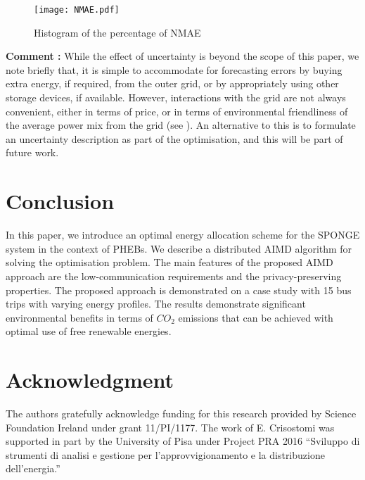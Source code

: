 \documentclass[journal]{IEEEtran}
\begin{document}
\begin{figure}[htbp]
	\begin{center}
		{\texttt{[image: NMAE.pdf]}}
		\caption{Histogram of the percentage of NMAE}
		\label{UCDNMAE}
	\end{center}
\end{figure}


{\bf Comment :}  While the effect of uncertainty is beyond the scope of this paper, we note briefly that, it is simple to accommodate for forecasting errors by buying extra energy, if required, from the outer grid, or by appropriately using other storage devices, if available. However, interactions with the grid are not always convenient, either in terms of price, or in terms of environmental friendliness of the average power mix from the grid (see \cite{TITS_V2G}). An alternative to this is to formulate an uncertainty
description as part of the optimisation, and this will be part of future work.   


\section{Conclusion}  \label{Conclusion}



In this paper, we introduce an optimal energy allocation scheme for the SPONGE system in the context of PHEBs. We describe a distributed AIMD algorithm for solving the optimisation problem. The main features of the proposed AIMD approach are the low-communication requirements and the privacy-preserving properties. The proposed approach is demonstrated on a case study with 15 bus trips with varying energy profiles. The results demonstrate significant environmental benefits in terms of $CO_2$ emissions that can be achieved with optimal use of free renewable energies.    


\section*{Acknowledgment}


The authors gratefully acknowledge funding for this research provided by Science Foundation Ireland under grant 11/PI/1177.  The work of E. Crisostomi was supported in part by the University of Pisa under Project PRA 2016 “Sviluppo di strumenti di analisi e gestione per l’approvvigionamento e la distribuzione dell’energia.”


\ifCLASSOPTIONcaptionsoff
  \newpage
\fi
\end{document}
